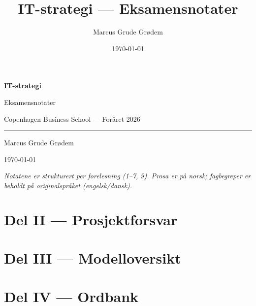 \documentclass[11pt,a4paper]{article}
\title{\textbf{IT-strategi --- Eksamensnotater}}
\author{Marcus Grude Grødem}
\date{\today}
\begin{document}
\begin{titlepage}
\centering
\vspace*{3cm}
{\Huge\bfseries\color{noteBlue} IT-strategi \par}
\vspace{0.6cm}
{\Large Eksamensnotater \par}
\vspace{1.2cm}
{\large Copenhagen Business School --- Foråret 2026 \par}
\vspace{2.5cm}
\rule{0.6\linewidth}{0.4pt}\par
\vspace{0.6cm}
{\large Marcus Grude Grødem \par}
\vspace{0.4cm}
{\small \today \par}
\vfill
{\small\itshape Notatene er strukturert per forelesning (1--7, 9). Prosa er på norsk;
fagbegreper er beholdt på originalspråket (engelsk/dansk).}\par
\vspace{1cm}
\end{titlepage}

\tableofcontents
\clearpage


\clearpage

\clearpage

\clearpage

\clearpage

\clearpage

\clearpage

\clearpage

\clearpage

\part*{Del II --- Prosjektforsvar}

\clearpage

\part*{Del III --- Modelloversikt}

\clearpage

\part*{Del IV --- Ordbank}

\end{document}
